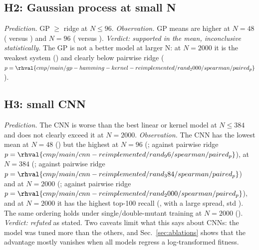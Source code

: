 \subsection{H2: Gaussian process at small N}
\emph{Prediction.} GP $\ge$ ridge at $N\le96$. \emph{Observation.} GP means are higher at $N{=}48$ ( versus ) and $N{=}96$ ( versus ). \emph{Verdict: supported in the mean, inconclusive statistically.} The GP is not a better model at larger N: at $N{=}2000$ it is the weakest system () and clearly below pairwise ridge ($p=\rhval{cmp/main/gp-hamming-kernel-reimplemented/rand_2000/spearman/paired_p}$).

\subsection{H3: small CNN}
\emph{Prediction.} The CNN is worse than the best linear or kernel model at $N\le384$ and does not clearly exceed it at $N{=}2000$. \emph{Observation.} The CNN has the lowest mean at $N{=}48$ () but the highest at $N{=}96$ (; against pairwise ridge $p=\rhval{cmp/main/cnn-reimplemented/rand_96/spearman/paired_p}$), at $N{=}384$ (; against pairwise ridge $p=\rhval{cmp/main/cnn-reimplemented/rand_384/spearman/paired_p}$) and at $N{=}2000$ (; against pairwise ridge $p=\rhval{cmp/main/cnn-reimplemented/rand_2000/spearman/paired_p}$), and at $N{=}2000$ it has the highest top-100 recall (, with a large spread, std ). The same ordering holds under single/double-mutant training at $N{=}2000$ (). \emph{Verdict: refuted} as stated. Two caveats limit what this says about CNNs: the model was tuned more than the others, and Sec.~\ref{sec:ablations} shows that the advantage mostly vanishes when all models regress a log-transformed fitness.

